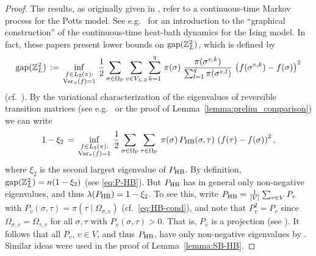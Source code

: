 \documentclass{dis}
\theoremstyle{citing}
\begin{document}
\begin{proof}
The results, as originally given in \cite{LS,MO1}, refer to a 
continuous-time Markov process for the Potts model. 
See e.g.~\cite{M} for an introduction to the 
``graphical construction'' of the continuous-time heat-bath 
dynamics for the Ising model. 
In fact, these papers present lower bounds on 
${\rm gap}({\ensuremath{\mathbb{Z}}}^2_L)$, which is defined by 
\[
{\rm gap}({\ensuremath{\mathbb{Z}}}^2_L) \,:=\, 
\inf_{\substack{f\in L_2(\pi):\\ {{\rm Var}}_\pi(f)=1}}\,
\frac12 \sum_{\sigma\in{{\Omega}_{\rm P}}}\sum_{v\in V_{L,2}}\sum_{k=1}^q \,
\pi(\sigma)\; 
\frac{\pi(\sigma^{v,k})}{\sum_{l=1}^q \pi(\sigma^{v,l})}\,
\left(f(\sigma^{v,k})-f(\sigma)\right)^2 
\]
(cf.~\cite[Sec.~3]{MOS}). By the variational characterization 
of the eigenvalues of reversible transition matrices 
(see e.g.~\cite{DS} or the proof of 
Lemma~\ref{lemma:prelim_comparison}) we can write 
\[
1-\xi_2 \,=\, \inf_{\substack{f\in L_2(\pi):\\ {{\rm Var}}_\pi(f)=1}}\,
\frac12 \sum_{\sigma\in{{\Omega}_{\rm P}}}\sum_{\tau\in{{\Omega}_{\rm P}}}\,
\pi(\sigma)\, {P_{\rm HB}}(\sigma,\tau)\,
\left(f(\tau)-f(\sigma)\right)^2,
\]
where $\xi_2$ is the second largest eigenvalue of ${P_{\rm HB}}$. 
By definition, ${\rm gap}({\ensuremath{\mathbb{Z}}}^2_L)=n (1-\xi_2)$ (see \eqref{eq:P-HB}). 
But ${P_{\rm HB}}$ has in general 
only non-negative eigenvalues, and thus $\lambda({P_{\rm HB}})=1-\xi_2$. 
To see this, write ${P_{\rm HB}}=\frac{1}{{\left\vert {V} \right\vert}}\sum_{v\in V} P_v$ with 
$P_v(\sigma,\tau)=\pi(\tau\mid{\Omega}_{\sigma,v})$ (cf.~\eqref{eq:HB-cond}), 
and note that $P_v^2=P_v$ since ${\Omega}_{\sigma,v}={\Omega}_{\tau,v}$ for 
all $\sigma,\tau$ with $P_v(\sigma,\tau)>0$. 
That is, $P_v$ is a projection (see \cite[Thm.~9.5-1]{Krey}).
It follows that all $P_v$, $v\in V$, and thus ${P_{\rm HB}}$, 
have only non-negative eigenvalues by \cite[9.5-2]{Krey}.
Similar ideas were used in the proof of Lemma~\ref{lemma:SB-HB}. 


\end{proof}
\end{document}
